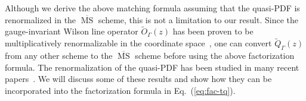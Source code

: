 \documentclass[prd,aps,twocolumn,preprintnumbers,showpacs,nofootinbib,superscriptaddress,notitlepage]{revtex4-1}
\begin{document}
Although we derive the above matching formula assuming that the quasi-PDF is renormalized in the $\overline{\ensuremath{\operatorname{MS}}}$ scheme, this is not a limitation to our result.
Since the gauge-invariant Wilson line operator $\tilde{O}_\Gamma(z)$ has been proven to be multiplicatively renormalizable in the coordinate space~\cite{Ji:2017oey,Ishikawa:2017faj}, one can convert $\tilde{Q}_{\Gamma}(z)$ from any other scheme to the $\overline{\ensuremath{\operatorname{MS}}}$ scheme before using the above factorization formula. The renormalization of the
quasi-PDF has been studied in many recent papers~\cite{Ji:2015jwa,Ishikawa:2016znu,Chen:2016fxx,Xiong:2017jtn,Constantinou:2017sej,Alexandrou:2017huk,Chen:2017mzz,Green:2017xeu,Stewart:2017tvs,Wang:2017eel}. We will discuss some
of these results and show how they can be incorporated into the factorization formula in Eq.~(\ref{eq:fac-tq}).
\end{document}
